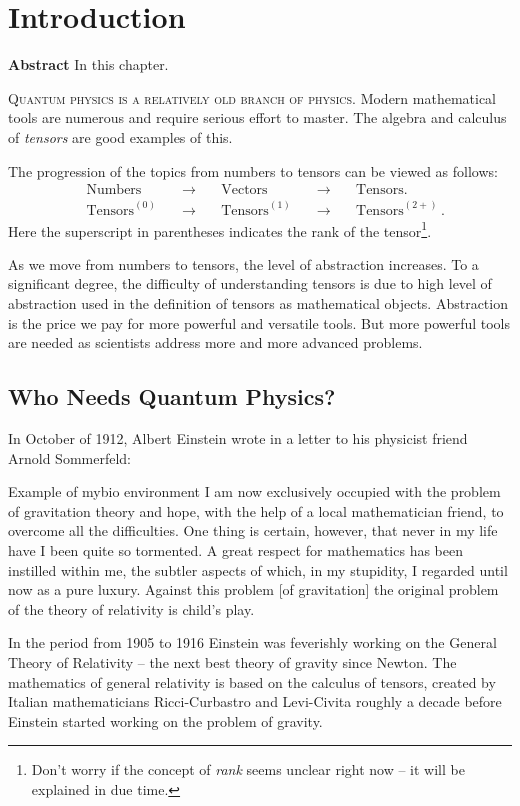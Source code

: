 \graphicspath{{../01Introduction/pics/}}

\chapter{Introduction}\label{ch:Introduction}
{\bf Abstract}\hspace{0.2cm} In this chapter.


\lettrine[lines=2]{\color{darkocre}Q}{uantum physics is a relatively old branch of physics}. Modern mathematical tools are numerous and require
serious effort to master. The algebra and calculus of \emph{tensors}
are good examples of this.

The progression of the topics from
numbers to tensors can be viewed as follows:
\begin{align*}
  & \textrm{Numbers} \quad & \rightarrow \quad & \textrm{Vectors} \quad &
  \rightarrow \quad & \textrm{Tensors.}\\
  & \textrm{Tensors}^{(0)} \quad & \rightarrow  \quad & \textrm{Tensors}^{(1)}
  \quad & \rightarrow \quad & \textrm{Tensors}^{(2+)}\,.
\end{align*}
Here the superscript in parentheses indicates the rank of the
tensor\footnote{Don't worry if the concept of \emph{rank} seems
unclear right now -- it will be explained in due time.}.

As we move from numbers to tensors, the level of abstraction
increases. To a significant degree, the difficulty of understanding
tensors is due to high level of abstraction used in the definition
of tensors as mathematical objects. Abstraction is the price we pay
for more powerful and versatile tools. But more powerful tools are
needed as scientists address more and more advanced problems.

 \section{Who Needs Quantum Physics?}

In October of 1912, Albert Einstein wrote in a letter to his physicist
friend Arnold Sommerfeld:
\begin{mybio}{Example of mybio environment}
  I am now exclusively occupied with the problem of gravitation theory
and hope, with the help of a local mathematician friend, to overcome
all the difficulties. One thing is certain, however, that never in my
life have I been quite so tormented. A great respect for mathematics
has been instilled within me, the subtler aspects of which, in my stupidity,
I regarded until now as a pure luxury. Against this problem [of
  gravitation] the original problem of the theory of relativity is
child’s play.
\end{mybio}
In the period from 1905 to 1916 Einstein was feverishly working on the
General Theory of Relativity -- the next
best theory of gravity since
Newton. The mathematics of general relativity is based on the calculus
of tensors, created by Italian mathematicians Ricci-Curbastro and
Levi-Civita roughly a decade before Einstein started working on the
problem of gravity.


